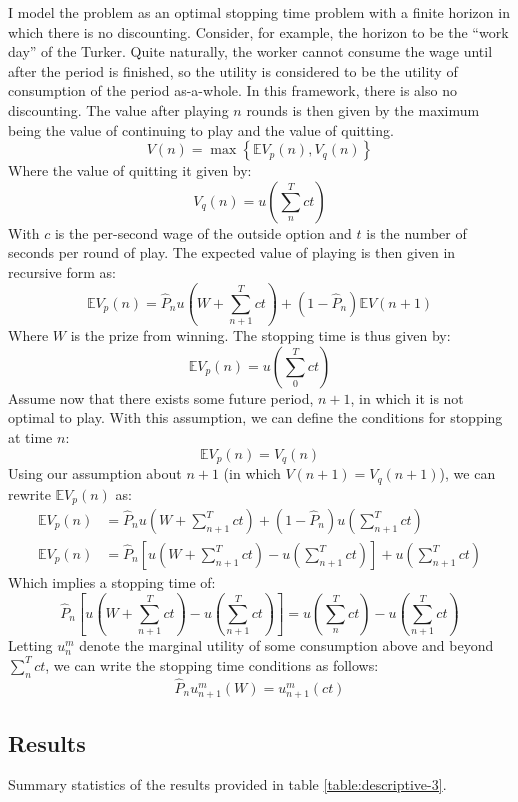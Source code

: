 \documentclass[a4paper,12pt]{article}
\begin{document}
I model the problem as an optimal stopping time problem with a finite horizon in which there is no discounting. Consider, for example, the horizon to be the ``work day'' of the Turker. Quite naturally, the worker cannot consume the wage until after the period is finished, so the utility is considered to be the utility of consumption of the period as-a-whole. In this framework, there is also no discounting. The value after playing $n$ rounds is then given by the maximum being the value of continuing to play and the value of quitting.
%
$$
V(n) = \max \left\{ \mathbb{E}V_p(n), V_q(n)  \right\}
$$
%
Where the value of quitting it given by:
%
$$
V_q(n) = u\left( \sum_n^T ct \right)
$$
%
With $c$ is the per-second wage of the outside option and $t$ is the number of seconds per round of play. The expected value of playing is then given in recursive form as:
%
$$
\mathbb{E}V_p(n) = \hat{P}_n u(W + \sum_{n+1}^T ct) + (1 - \hat{P}_n) \mathbb{E}V(n+1)
$$
%
Where $W$ is the prize from winning. The stopping time is thus given by:
$$
\mathbb{E}V_p(n) = u\left( \sum_0^T ct \right)
$$
%
Assume now that there exists some future period, $n+1$, in which it is not optimal to play. With this assumption, we can define the conditions for stopping at time $n$:
%
$$
\mathbb{E}V_p(n) = V_q(n)
$$
Using our assumption about $n+1$ (in which $V(n+1) = V_q(n+1)$), we can rewrite $\mathbb{E}V_p(n)$ as:
\begin{align*}
\mathbb{E}V_p(n) &= \hat{P}_n u(W + \sum_{n+1}^T ct) + (1 - \hat{P}_n)u\left( \sum_{n+1}^T ct \right) \\
\mathbb{E}V_p(n) &= \hat{P}_n \left[   u(W + \sum_{n+1}^T ct) - u\left( \sum_{n+1}^T ct \right) \right]+ u\left( \sum_{n+1}^T ct \right)
\end{align*}
%
Which implies a stopping time of:
$$
\hat{P}_n \left[   u(W + \sum_{n+1}^T ct) - u\left( \sum_{n+1}^T ct \right) \right] = u\left( \sum_n^T ct \right) - u\left( \sum_{n+1}^T ct \right)
$$
%
Letting $u^m_{n}$ denote the marginal utility of some consumption above and beyond $\sum_{n}^T ct$, we can write the stopping time conditions as follows:
$$
\hat{P}_{n} u^m_{n+1}(W) = u^m_{n+1}(ct)
$$

\subsection{ Results }

Summary statistics of the results provided in table \ref{table:descriptive-3}.
\end{document}
